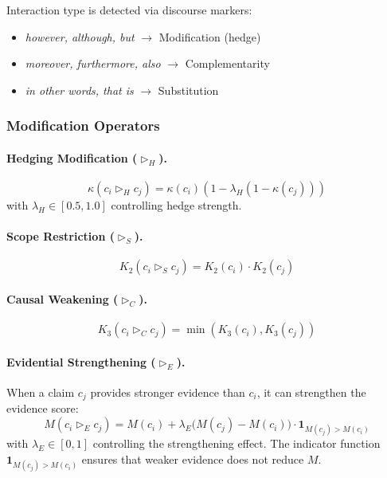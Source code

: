 Interaction type is detected via discourse markers:
\begin{itemize}
    \item \emph{however, although, but} $\rightarrow$ Modification (hedge)
    \item \emph{moreover, furthermore, also} $\rightarrow$ Complementarity
    \item \emph{in other words, that is} $\rightarrow$ Substitution
\end{itemize}

\subsubsection{Modification Operators}

\paragraph{Hedging Modification ($\triangleright_H$).}
\begin{equation}
\kappa(c_i \triangleright_H c_j) = \kappa(c_i)\left(1 - \lambda_H(1-\kappa(c_j))\right)
\end{equation}
with $\lambda_H \in [0.5,1.0]$ controlling hedge strength.

\paragraph{Scope Restriction ($\triangleright_S$).}
\begin{equation}
K_2(c_i \triangleright_S c_j) = K_2(c_i) \cdot K_2(c_j)
\end{equation}

\paragraph{Causal Weakening ($\triangleright_C$).}
\begin{equation}
K_3(c_i \triangleright_C c_j) = \min(K_3(c_i), K_3(c_j))
\end{equation}

\paragraph{Evidential Strengthening ($\triangleright_E$).}
When a claim $c_j$ provides stronger evidence than $c_i$, it can strengthen the evidence score:
\begin{equation}
M(c_i \triangleright_E c_j) = M(c_i) + \lambda_E \bigl(M(c_j) - M(c_i)\bigr) \cdot \mathbf{1}_{M(c_j) > M(c_i)}
\end{equation}
with $\lambda_E \in [0,1]$ controlling the strengthening effect. The indicator function $\mathbf{1}_{M(c_j) > M(c_i)}$ ensures that weaker evidence does not reduce $M$.

